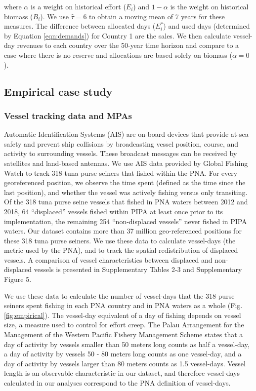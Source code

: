 \documentclass[12pt]{article}
\begin{document}
\noindent where $\alpha$ is a weight on historical effort ($E_i$) and $1-\alpha$ is the weight on historical biomass ($B_i$). We use $\hat{\tau}= 6$ to obtain a moving mean of 7 years for these measures. The difference between allocated days ($E_i^*$) and used days (determined by Equation \ref{eqn:demands}) for Country 1 are the sales. We then calculate vessel-day revenues to each country over the 50-year time horizon and compare to a case where there is no reserve and allocations are based solely on biomass ($\alpha = 0$).

\subsection{Empirical case study}

\subsubsection{Vessel tracking data and MPAs}

Automatic Identification Systems (AIS) are on-board devices that provide at-sea safety and prevent ship collisions by broadcasting vessel position, course, and activity to surrounding vessels. These broadcast messages can be received by satellites and land-based antennas. We use AIS data provided by Global Fishing Watch \cite{kroodsma_2018} to track 318 tuna purse seiners that fished within the PNA. For every georeferenced position, we observe the time spent (defined as the time since the last position), and whether the vessel was actively fishing versus only transiting. Of the 318 tuna purse seine vessels that fished in PNA waters between 2012 and 2018, 64 ``displaced'' vessels fished within PIPA at least once prior to its implementation, the remaining 254 ``non-displaced vessels'' never fished in PIPA waters. Our dataset contains more than 37 million geo-referenced positions for these 318 tuna purse seiners. We use these data to calculate vessel-days (the metric used by the PNA), and to track the spatial redistribution of displaced vessels. A comparison of vessel characteristics between displaced and non-displaced vessels is presented in Supplementary Tables 2-3 and Supplementary Figure 5.

We use these data to calculate the number of vessel-days that the 318 purse seiners spent fishing in each PNA country and in PNA waters as a whole (Fig. \ref{fig:empirical}). The vessel-day equivalent of a day of fishing depends on vessel size, a measure used to control for effort creep. The Palau Arrangement for the Management of the Western Pacific Fishery Management Scheme \cite{pna_2016} states that a day of activity by vessels smaller than 50 meters long counts as half a vessel-day, a day of activity by vessels 50 - 80 meters long counts as one vessel-day, and a day of activity by vessels larger than 80 meters counts as 1.5 vessel-days. Vessel length is an observable characteristic in our dataset, and therefore vessel-days calculated in our analyses correspond to the PNA definition of vessel-days.
\end{document}
